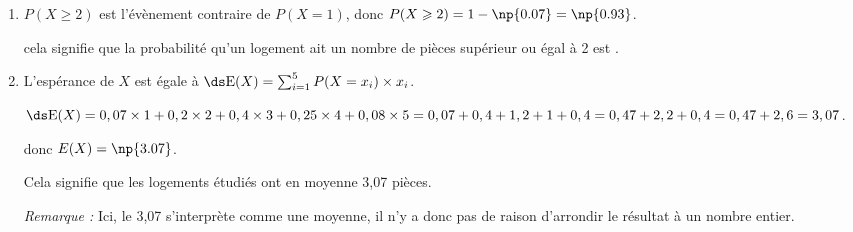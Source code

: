 \begin{enumerate}
\begin{enumerate}
			\item \mbox{$P(X\geqslant 2)$} est l'évènement contraire de \mbox{$P(X = 1)$}, donc \quad \mbox{$P(X\geqslant 2) = 1-\np{0.07} = \np{0.93}$.}

			cela signifie que la probabilité qu'un logement ait un nombre de pièces supérieur ou égal à 2 est .

			\item L'espérance de $X$ est égale à \quad $\ds \mathrm{E}(X) = \sum_{i = 1}^5 P(X = x_i)\times x_i$.

			$\ds \mathrm{E}(X) = 0,07 \times 1 + 0,2 \times 2 + 0,4 \times 3 + 0,25 \times 4 + 0,08 \times 5 = 0,07 + 0,4 + 1,2 + 1 + 0,4 = 0,47 + 2,2 + 0,4 = 0,47 + 2,6 = 3,07$.

			donc \mbox{$E(X) = \np{3.07}$}.

			Cela signifie que les logements étudiés ont en moyenne 3,07 pièces.

			\emph{Remarque :} Ici, le 3,07 s'interprète comme une moyenne, il n'y a donc pas de raison d'arrondir le résultat à un nombre entier.
		\end{enumerate}
	\end{enumerate}
